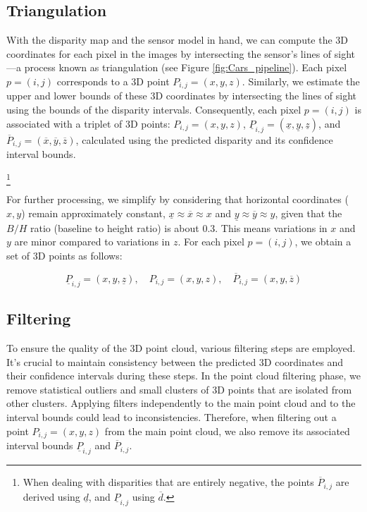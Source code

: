 \subsection{Triangulation}
With the disparity map and the sensor model in hand, we can compute the 3D coordinates for each pixel in the images by intersecting the sensor's lines of sight—a process known as triangulation (see Figure \ref{fig:Cars_pipeline}). Each pixel \( p = (i, j) \) corresponds to a 3D point \( P_{i,j} = (x, y, z) \). Similarly, we estimate the upper and lower bounds of these 3D coordinates by intersecting the lines of sight using the bounds of the disparity intervals. Consequently, each pixel \( p = (i, j) \) is associated with a triplet of 3D points: \( P_{i,j} = (x, y, z) \), \( \underline{P}_{i,j} = (\underline{x}, \underline{y}, \underline{z}) \), and \( \overline{P}_{i,j} = (\overline{x}, \overline{y}, \overline{z}) \), calculated using the predicted disparity and its confidence interval bounds.

\footnote{When dealing with disparities that are entirely negative, the points \( \overline{P}_{i,j} \) are derived using \( \underline{d} \), and \( \underline{P}_{i,j} \) using \( \overline{d} \).}

For further processing, we simplify by considering that horizontal coordinates (\( x, y \)) remain approximately constant, \( \underline{x} \approx \overline{x} \approx x \) and \( \underline{y} \approx \overline{y} \approx y \), given that the $B/H$ ratio (baseline to height ratio) is about 0.3. This means variations in \( x \) and \( y \) are minor compared to variations in \( z \). For each pixel \( p = (i, j) \), we obtain a set of 3D points as follows:

\begin{equation}
    \underline{P}_{i,j} = (x, y, \underline{z}), \quad P_{i,j} = (x, y, z), \quad \overline{P}_{i,j} = (x, y, \overline{z})
\end{equation}

\subsection{Filtering}
To ensure the quality of the 3D point cloud, various filtering steps are employed. It's crucial to maintain consistency between the predicted 3D coordinates and their confidence intervals during these steps. In the point cloud filtering phase, we remove statistical outliers and small clusters of 3D points that are isolated from other clusters. Applying filters independently to the main point cloud and to the interval bounds could lead to inconsistencies. Therefore, when filtering out a point \( P_{i,j} = (x, y, z) \) from the main point cloud, we also remove its associated interval bounds \( \underline{P}_{i,j} \) and \( \overline{P}_{i,j} \).

